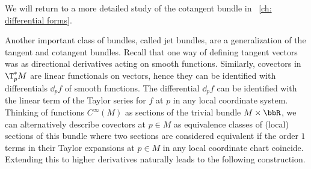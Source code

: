 We will return to a more detailed study of the cotangent bundle in \Chap~\ref{ch: differential forms}.

Another important class of bundles, called jet bundles, are a generalization of the tangent and cotangent bundles. Recall that one way of defining tangent vectors was as directional derivatives acting on smooth functions. Similarly, covectors in $\T_p^\ast M$ are linear functionals on vectors, hence they can be identified with differentials $\dd_p f$ of smooth functions. The differential $\dd_p f$ can be identified with the linear term of the Taylor series for $f$ at $p$ in any local coordinate system. Thinking of functions $C^\infty(M)$ as sections of the trivial bundle $M\times\bbR$, we can alternatively describe covectors at $p\in M$ as equivalence classes of (local) sections of this bundle where two sections are considered equivalent if the order $1$ terms in their Taylor expansions at $p\in M$ in any local coordinate chart coincide. Extending this to higher derivatives naturally leads to the following construction.

